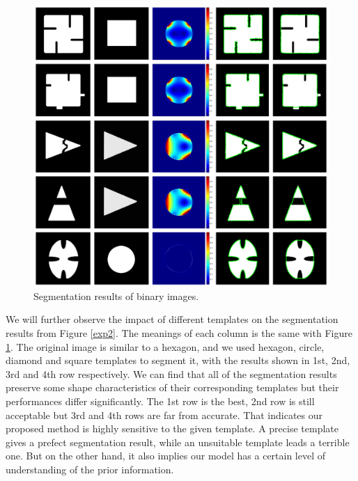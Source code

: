 \documentclass[review,onefignum,onetabnum]{siamonline190516}
\begin{document}
\begin{figure}
    \begin{center}
        \includegraphics[width=15.5cm]{src/exp1.png}
    \end{center}
    \caption{Segmentation results of binary images.}
    \label{exp1}
\end{figure}

We will further observe the impact of different templates on the segmentation results from Figure \ref{exp2}. The meanings of each column is the same with Figure \ref{exp1}. The original image is similar to a hexagon, and we used hexagon, circle, diamond and square templates to segment it, with the results shown in 1st, 2nd, 3rd and 4th row respectively. We can find that all of the segmentation results preserve some shape characteristics of their corresponding templates but their performances differ significantly. The 1st row is the best, 2nd row is still acceptable but 3rd and 4th rows are far from accurate. That indicates our proposed method is highly sensitive to the given template. A precise template gives a prefect segmentation result, while an unsuitable template leads a terrible one. But on the other hand, it also implies our model has a certain level of understanding of the prior information.
\end{document}
